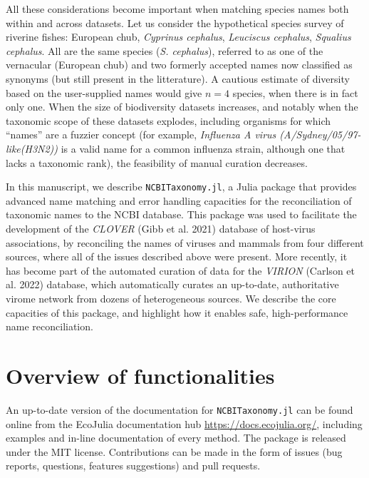 \documentclass[11pt]{article}
\begin{document}
All these considerations become important when matching species names
both within and across datasets. Let us consider the hypothetical
species survey of riverine fishes: European chub, \emph{Cyprinus
cephalus}, \emph{Leuciscus cephalus}, \emph{Squalius cephalus}. All are
the same species (\emph{S. cephalus}), referred to as one of the
vernacular (European chub) and two formerly accepted names now
classified as synonyms (but still present in the litterature). A
cautious estimate of diversity based on the user-supplied names would
give \(n=4\) species, when there is in fact only one. When the size of
biodiversity datasets increases, and notably when the taxonomic scope of
these datasets explodes, including organisms for which ``names'' are a
fuzzier concept (for example, \emph{Influenza A virus
(A/Sydney/05/97-like(H3N2))} is a valid name for a common influenza
strain, although one that lacks a taxonomic rank), the feasibility of
manual curation decreases.

In this manuscript, we describe \texttt{NCBITaxonomy.jl}, a Julia
package that provides advanced name matching and error handling
capacities for the reconciliation of taxonomic names to the NCBI
database. This package was used to facilitate the development of the
\emph{CLOVER} (Gibb et al. 2021) database of host-virus associations, by
reconciling the names of viruses and mammals from four different
sources, where all of the issues described above were present. More
recently, it has become part of the automated curation of data for the
\emph{VIRION} (Carlson et al. 2022) database, which automatically
curates an up-to-date, authoritative virome network from dozens of
heterogeneous sources. We describe the core capacities of this package,
and highlight how it enables safe, high-performance name reconciliation.

\hypertarget{overview-of-functionalities}{%
\section{Overview of
functionalities}\label{overview-of-functionalities}}

An up-to-date version of the documentation for \texttt{NCBITaxonomy.jl}
can be found online from the EcoJulia documentation hub
\href{https://docs.ecojulia.org/NCBITaxonomy.jl/stable/}{https://docs.ecojulia.org/},
including examples and in-line documentation of every method. The
package is released under the MIT license. Contributions can be made in
the form of issues (bug reports, questions, features suggestions) and
pull requests.
\end{document}
